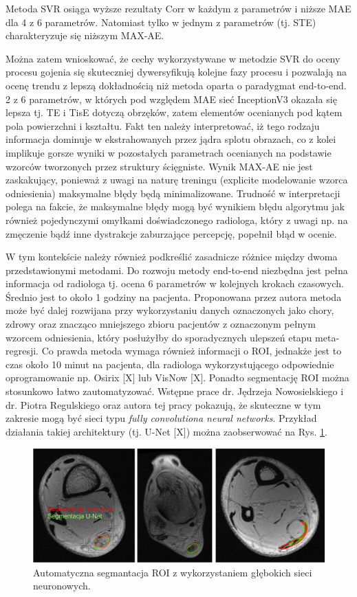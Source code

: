 Metoda SVR osiąga wyższe rezultaty Corr w każdym z parametrów i niższe MAE dla 4 z 6 parametrów. Natomiast tylko w jednym z parametrów (tj. STE) charakteryzuje się niższym MAX-AE. 

Można zatem wnioskować, że cechy wykorzystywane w metodzie SVR do oceny procesu gojenia się skuteczniej dywersyfikują kolejne fazy procesu i pozwalają na ocenę trendu z lepszą dokładnością niż metoda oparta o paradygmat end-to-end. 2 z 6 parametrów, w których pod względem MAE sieć InceptionV3 okazała się lepsza tj. TE i TisE dotyczą obrzęków, zatem elementów ocenianych pod kątem pola powierzchni i kształtu. Fakt ten należy interpretować, iż tego rodzaju informacja dominuje w ekstrahowanych przez jądra splotu obrazach, co z kolei implikuje gorsze wyniki w pozostałych parametrach ocenianych na podstawie wzorców tworzonych przez struktury ścięgniste. Wynik MAX-AE nie jest zaskakujący, ponieważ z uwagi na naturę treningu (explicite modelowanie wzorca odniesienia) maksymalne błędy będą minimalizowane. Trudność w interpretacji polega na fakcie, że maksymalne błędy mogą być wynikiem błędu algorytmu jak również pojedynczymi omyłkami doświadczonego radiologa, który z uwagi np. na zmęczenie bądź inne dystrakcje zaburzające percepcję, popełnił błąd w ocenie.  

W tym kontekście należy również podkreślić zasadnicze różnice między dwoma przedstawionymi metodami. Do rozwoju metody end-to-end niezbędna jest pełna informacja od radiologa tj. ocena 6 parametrów w kolejnych krokach czasowych. Średnio jest to około 1 godziny na pacjenta. Proponowana przez autora metoda może być dalej rozwijana przy wykorzystaniu danych oznaczonych jako chory, zdrowy oraz znacząco mniejszego zbioru pacjentów z oznaczonym pełnym wzorcem odniesienia, który posłużyłby do sporadycznych ulepszeń etapu meta-regresji. Co prawda metoda wymaga również informacji o ROI, jednakże jest to czas około 10 minut na pacjenta, dla radiologa wykorzystującego odpowiednie oprogramowanie np. Osirix [X] lub VisNow [X]. Ponadto segmentację ROI można stosunkowo łatwo zautomatyzować. Wstępne prace dr. Jędrzeja Nowosielskiego i dr. Piotra Regulskiego oraz autora tej pracy pokazują, że skuteczne w tym zakresie mogą być sieci typu \textit{fully convolutiona neural networks}. Przykład działania takiej architektury (tj. U-Net [X]) można zaobserwować na Rys. \ref{fig:segmentacja}. 

\begin{figure}[h]
	\centering
	\includegraphics[width=1\textwidth]{figures/Segmentacja.png}
	\caption{Automatyczna segmantacja ROI z wykorzystaniem głębokich sieci neuronowych.}\label{fig:segmentacja}
\end{figure}

